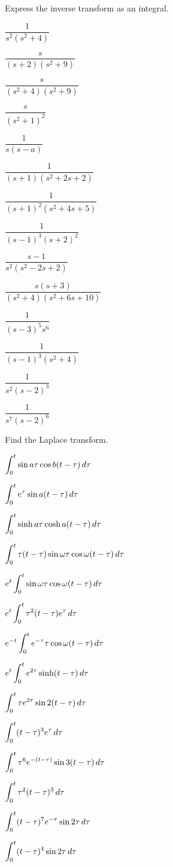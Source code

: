 \begin{exerciselist}

\item\label{exer:8.6.1}Express the inverse transform as an integral.

\begin{alist*}[columns=2]
\item $\dfrac{1}{s^2(s^2+4)}$
\item $\dfrac{s}{(s+2)(s^2+9)}$
\item $\dfrac{s}{(s^2+4)(s^2+9)}$
\item $\dfrac{s}{(s^2+1)^2}$
\item $\dfrac{1}{s(s-a)}$
\item $\dfrac{1}{(s+1)(s^2+2s+2)}$
\item $\dfrac{1}{(s+1)^2(s^2+4s+5)}$
\item $\dfrac{1}{(s-1)^3(s+2)^2}$
\item $\dfrac{s-1}{s^2(s^2-2s+2)}$
\item $\dfrac{s(s+3)}{(s^2+4)(s^2+6s+10)}$
\item $\dfrac{1}{(s-3)^5s^6}$
\item $\dfrac{1}{(s-1)^3(s^2+4)}$
\item $\dfrac{1}{s^2(s-2)^3}$
\item $\dfrac{1}{s^7(s-2)^6}$
\end{alist*}

\item\label{exer:8.6.2}Find the Laplace transform.

\begin{alist*}[columns=2]
\item $\displaystyle{\int_0^t\sin a\tau\cos b(t-\tau)\, d\tau}$
\item $\displaystyle{\int_0^t e^\tau\sin a(t-\tau)\,d\tau}$
\item $\displaystyle{\int_0^t\sinh a\tau\cosh a(t-\tau)\,d\tau}$
\item $\displaystyle{\int_0^t\tau(t-\tau)\sin \omega\tau\cos\omega(t-\tau)\,d\tau}$
\item $\displaystyle{e^t\int_0^t\sin\omega\tau\cos\omega (t-\tau)\,d\tau}$
\item $\displaystyle{e^t\int_0^t\tau^2 (t-\tau)e^\tau\,d\tau}$
\item $\displaystyle{e^{-t}\int_0^t e^{-\tau}\tau\cos\omega (t-\tau)\,d\tau}$
\item $\displaystyle{e^t\int_0^t e^{2\tau}\sinh(t-\tau)\,d\tau}$
\item $\displaystyle{\int_0^t\tau e^{2\tau}\sin2(t-\tau)\,d\tau}$
\item $\displaystyle{\int_0^t (t-\tau)^3 e^\tau\, d\tau}$
\item $\displaystyle{\int_0^t\tau^6 e^{-(t-\tau)}\sin 3(t-\tau)\,d\tau}$
\item $\displaystyle{\int_0^t\tau^2 (t-\tau)^3\,d\tau}$
\item $\displaystyle{\int_0^t (t-\tau)^7 e^{-\tau}\sin 2\tau\,d\tau}$
\item $\displaystyle{\int_0^t (t-\tau)^4\sin2\tau\,d\tau}$
\end{alist*}


\end{exerciselist}
